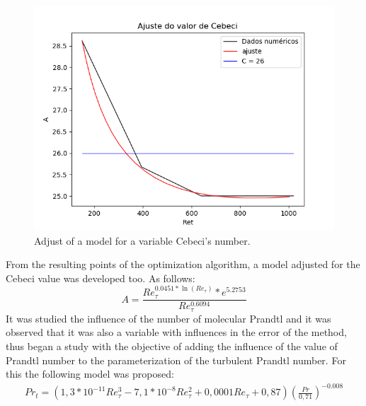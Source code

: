 \documentclass[10pt]{article} %
\begin{document}
\begin{figure}[!h]
	\centering
	\includegraphics[angle=0, scale=0.295]{ajustecebeci}
	\caption{Adjust of a model for a variable Cebeci's number.}
\end{figure}
 From the resulting points of the optimization algorithm, a model adjusted for the Cebeci value was developed too. As follows:
\begin{equation}
A = \frac{Re_\tau ^{0.0451 * \ln(Re_\tau)} *e ^ {5.2753} }{Re_\tau ^{0.6094}}
\end{equation}
It was studied the influence of the number of molecular Prandtl and it was observed that it was also a variable with influences in the error of the method, thus began a study with the objective of adding the influence of the value of Prandtl number to the parameterization of the turbulent Prandtl number. For this the following model was proposed:
\begin{equation}
\begin{split}
Pr_t = \left( 1,3 * 10^{-11} Re_\tau^3 - 7,1 * 10^{-8} Re_\tau^2 + 0,0001 Re_\tau + 0,87 \right) \left(  \frac{Pr}{0,71}\right) ^{-0.008}
\end{split}
\end{equation}
\end{document}
